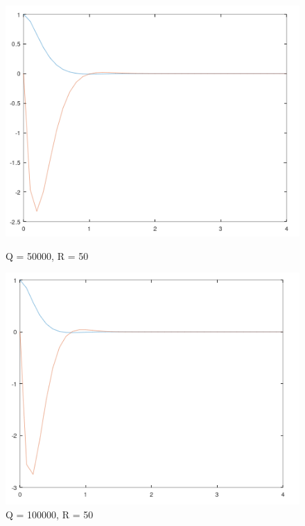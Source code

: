 \documentclass{jsarticle}
\begin{document}
\begin{figure}[h!]
  \centering
  \begin{minipage}{0.325\linewidth}
    \centering
    \includegraphics[width=\linewidth]{./fig/q50000_r50.png}
    \caption{Q = 50000, R = 50}
  \end{minipage}
  \hfill
  \begin{minipage}{0.325\linewidth}
    \centering
    \includegraphics[width=\linewidth]{./fig/q100000_r50.png}
    \caption{Q = 100000, R = 50}
  \end{minipage}
  \hfill
  \begin{minipage}{0.325\linewidth}
    \centering

\end{minipage}
\end{figure}
\end{document}

